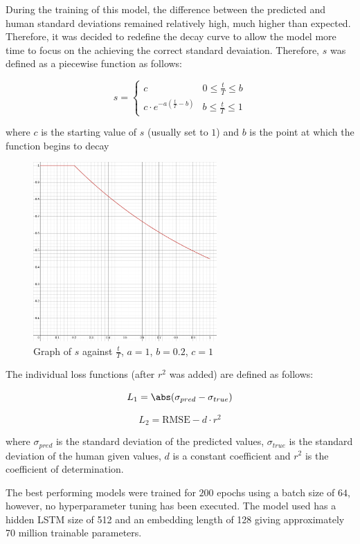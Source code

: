 \documentclass[11pt]{article}
\begin{document}
During the training of this model, the difference between the predicted and human standard deviations remained relatively high, much higher than expected. Therefore, it was decided to redefine the decay curve to allow the model more time to focus on the achieving the correct standard devaiation. Therefore, \(s\) was defined as a piecewise function as follows:

\[ s = \begin{cases}
c & 0\leq \frac{t}{T} \leq b \\
c \cdot e^{-a(\frac{t}{T} - b)} & b \leq \frac{t}{T} \leq 1
\end{cases} \]

where \(c\) is the starting value of \(s\) (usually set to \(1\)) and \(b\) is the point at which the function begins to decay

\begin{figure}[htbp]
\centering
\includegraphics[width=7cm]{./decay_wb.png}
\caption{Graph of \(s\) against \(\frac{t}{T}\), \(a=1\), \(b=0.2\), \(c=1\) \label{fig:exponential_wb}}
\end{figure}

The individual loss functions (after \(r^2\) was added) are defined as follows:

$$ L_1 = \abs(\sigma_{pred} - \sigma_{true}) $$

$$ L_2 = \text{RMSE}-d \cdot r^2 $$

where \(\sigma_{pred}\) is the standard deviation of the predicted values, \(\sigma_{true}\) is the standard deviation of the human given values, \(d\) is a constant coefficient and \(r^2\) is the coefficient of determination.

The best performing models were trained for \(200\) epochs using a batch size of \(64\), however, no hyperparameter tuning has been executed. The model used has a hidden LSTM size of 512 and an embedding length of 128 giving approximately 70 million trainable parameters.
\end{document}
